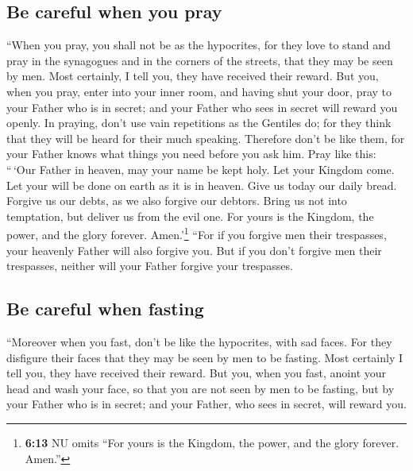 \hypertarget{be-careful-when-you-pray}{%
\subsection{Be careful when you pray}\label{be-careful-when-you-pray}}

 ``When you pray, you shall not be as the hypocrites, for
they love to stand and pray in the synagogues and in the corners of the
streets, that they may be seen by men. Most certainly, I tell you, they
have received their reward.  But you, when you pray, enter
into your inner room, and having shut your door, pray to your Father who
is in secret; and your Father who sees in secret will reward you openly.
 In praying, don't use vain repetitions as the Gentiles
do; for they think that they will be heard for their much speaking.
 Therefore don't be like them, for your Father knows what
things you need before you ask him.  Pray like this:
``\,`Our Father in heaven, may your name be kept holy. 
Let your Kingdom come. Let your will be done on earth as it is in
heaven.  Give us today our daily bread. 
Forgive us our debts, as we also forgive our debtors. 
Bring us not into temptation, but deliver us from the evil one. For
yours is the Kingdom, the power, and the glory forever.
Amen.'\footnote{\textbf{6:13} NU omits ``For yours is the Kingdom, the
  power, and the glory forever. Amen.''}  ``For if you
forgive men their trespasses, your heavenly Father will also forgive
you.  But if you don't forgive men their trespasses,
neither will your Father forgive your trespasses.

\hypertarget{be-careful-when-fasting}{%
\subsection{Be careful when fasting}\label{be-careful-when-fasting}}

 ``Moreover when you fast, don't be like the hypocrites,
with sad faces. For they disfigure their faces that they may be seen by
men to be fasting. Most certainly I tell you, they have received their
reward.  But you, when you fast, anoint your head and
wash your face,  so that you are not seen by men to be
fasting, but by your Father who is in secret; and your Father, who sees
in secret, will reward you.

